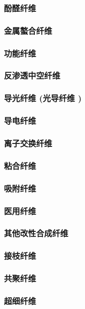 \documentclass[UTF8]{../../ApplicationUniverse}
\begin{document}
            \subsubsection{酚醛纤维}
            \subsubsection{金属螯合纤维}
    \subsubsection{功能纤维}
        \subsubsection{反渗透中空纤维}
        \subsubsection{导光纤维 (光导纤维 )}
        \subsubsection{导电纤维}
        \subsubsection{离子交换纤维}
        \subsubsection{粘合纤维}
        \subsubsection{吸附纤维}
        \subsubsection{医用纤维}
    \subsubsection{其他改性合成纤维}
        \subsubsection{接枝纤维}
        \subsubsection{共聚纤维}
        \subsubsection{超细纤维}
\end{document}
